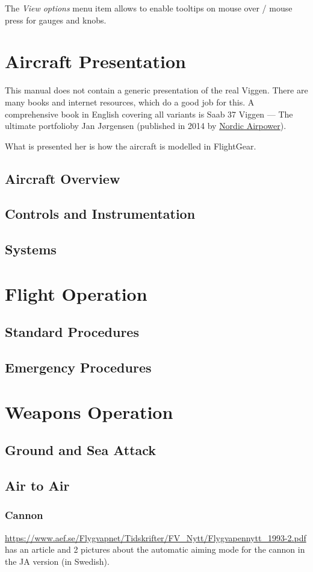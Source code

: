 The \emph{View options} menu item allows to enable tooltips on mouse over / mouse press for gauges and knobs.

\part{Aircraft Presentation}
This manual does not contain a generic presentation of the real Viggen. There are many books and internet resources, which do a good job for this. A comprehensive book in English covering all variants is \glqq Saab 37 Viggen --- The ultimate portfolio\grqq by Jan Jørgensen (published in 2014 by \href{http://www.nordicairpower.com/}{Nordic Airpower}).

What is presented her is how the aircraft is modelled in FlightGear.

\chapter{Aircraft Overview}
\chapter{Controls and Instrumentation}
\chapter{Systems}

\part{Flight Operation}
\chapter{Standard Procedures}
\chapter{Emergency Procedures}

\part{Weapons Operation}
\chapter{Ground and Sea Attack}
\chapter{Air to Air}
\section{Cannon}
\url{https://www.aef.se/Flygvapnet/Tidskrifter/FV_Nytt/Flygvapennytt_1993-2.pdf} has an article and 2 pictures about the automatic aiming mode for the cannon in the JA version (in Swedish).


